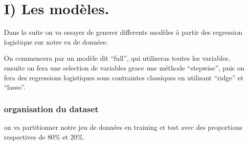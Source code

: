 \documentclass[
]{article}
\newenvironment{Shaded}{\begin{snugshade}}{\end{snugshade}}
\newcommand{\CommentTok}[1]{\textcolor[rgb]{0.56,0.35,0.01}{\textit{#1}}}
\newcommand{\DataTypeTok}[1]{\textcolor[rgb]{0.13,0.29,0.53}{#1}}
\newcommand{\DecValTok}[1]{\textcolor[rgb]{0.00,0.00,0.81}{#1}}
\newcommand{\FloatTok}[1]{\textcolor[rgb]{0.00,0.00,0.81}{#1}}
\newcommand{\KeywordTok}[1]{\textcolor[rgb]{0.13,0.29,0.53}{\textbf{#1}}}
\newcommand{\NormalTok}[1]{#1}
\newcommand{\OperatorTok}[1]{\textcolor[rgb]{0.81,0.36,0.00}{\textbf{#1}}}
\newcommand{\StringTok}[1]{\textcolor[rgb]{0.31,0.60,0.02}{#1}}
\begin{document}
\hypertarget{i-les-moduxe8les.}{%
\section{I) Les modèles.}\label{i-les-moduxe8les.}}

Dans la suite on va essayer de generer differents modèles à partir des
regression logistique sur notre eu de données:

On commencera par un modèle dit ``full'', qui utiliseras toutes les
variables, ensuite on fera une selection de variables grace une méthode
``stepwise'', puis on fera des regressions logistiques sous contraintes
classiques en utilisant ``ridge'' et ``lasso''.

\hypertarget{organisation-du-dataset}{%
\subsubsection{organisation du dataset}\label{organisation-du-dataset}}

on va partitionner notre jeu de données en training et test avec des
proportions respectives de 80\% et 20\%.

\begin{Shaded}
\end{Shaded}
\end{document}
